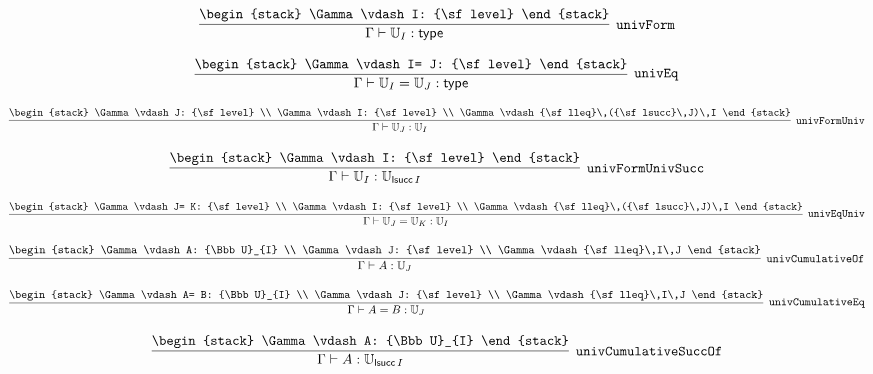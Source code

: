 \[
\infer[{\tt univForm}]{\Gamma \vdash {\Bbb U}_{I}: {\sf type}}{
\begin{stack}
\Gamma \vdash I: {\sf level}
\end{stack}}
\]

\[
\infer[{\tt univEq}]{\Gamma \vdash {\Bbb U}_{I}= {\Bbb U}_{J}: {\sf type}}{
\begin{stack}
\Gamma \vdash I= J: {\sf level}
\end{stack}}
\]

\[
\infer[{\tt univFormUniv}]{\Gamma \vdash {\Bbb U}_{J}: {\Bbb U}_{I}}{
\begin{stack}
\Gamma \vdash J: {\sf level}
\\
\Gamma \vdash I: {\sf level}
\\
\Gamma \vdash {\sf lleq}\,({\sf lsucc}\,J)\,I
\end{stack}}
\]

\[
\infer[{\tt univFormUnivSucc}]{\Gamma \vdash {\Bbb U}_{I}: {\Bbb U}_{{\sf lsucc}\,I}}{
\begin{stack}
\Gamma \vdash I: {\sf level}
\end{stack}}
\]

\[
\infer[{\tt univEqUniv}]{\Gamma \vdash {\Bbb U}_{J}= {\Bbb U}_{K}: {\Bbb U}_{I}}{
\begin{stack}
\Gamma \vdash J= K: {\sf level}
\\
\Gamma \vdash I: {\sf level}
\\
\Gamma \vdash {\sf lleq}\,({\sf lsucc}\,J)\,I
\end{stack}}
\]

\[
\infer[{\tt univCumulativeOf}]{\Gamma \vdash A: {\Bbb U}_{J}}{
\begin{stack}
\Gamma \vdash A: {\Bbb U}_{I}
\\
\Gamma \vdash J: {\sf level}
\\
\Gamma \vdash {\sf lleq}\,I\,J
\end{stack}}
\]

\[
\infer[{\tt univCumulativeEq}]{\Gamma \vdash A= B: {\Bbb U}_{J}}{
\begin{stack}
\Gamma \vdash A= B: {\Bbb U}_{I}
\\
\Gamma \vdash J: {\sf level}
\\
\Gamma \vdash {\sf lleq}\,I\,J
\end{stack}}
\]

\[
\infer[{\tt univCumulativeSuccOf}]{\Gamma \vdash A: {\Bbb U}_{{\sf lsucc}\,I}}{
\begin{stack}
\Gamma \vdash A: {\Bbb U}_{I}
\end{stack}}
\]

